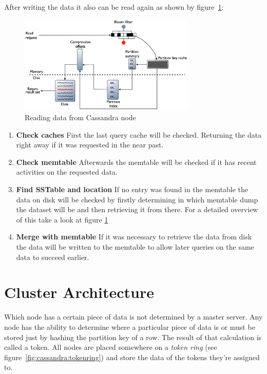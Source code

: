 After writing the data it also can be read again as shown by figure~\ref{fig:cassandra:readData}:

\begin{figure}[ht]
    \centering
    \includegraphics[width=0.75\textwidth]{img/cassandra_local_read.png}
    \caption{Reading data from Cassandra node \autocite{datastaxReadData}}
    \label{fig:cassandra:readData}
\end{figure}
\begin{enumerate}
    \item \textbf{Check caches} First the last query cache will be checked. Returning the data right away if it was requested in the near past.
    \item \textbf{Check memtable} Afterwards the memtable will be checked if it has recent activities on the requested data.
    \item \textbf{Find SSTable and location} If no entry was found in the memtable the data on disk will be checked by firstly determining in which memtable dump the dataset will be and then retrieving it from there. For a detailed overview of this take a look at figure \ref{fig:cassandra:readData}
    \item \textbf{Merge with memtable} If it was necessary to retrieve the data from disk the data will be written to the memtable to allow later queries on the same data to succeed earlier.
\end{enumerate}

\section{Cluster Architecture}\label{sec:CassandraClusterArchitecture}  %
Which node has a certain piece of data is not determined by a master server. Any node has the ability to determine where a particular piece of data is or must be stored just by hashing the partition key of a row. The result of that calculation is called a token. All nodes are placed somewhere on a \textit{token ring} (see figure~\ref{fig:cassandra:tokenring}) and store the data of the tokens they're assigned to.\autocite[2]{cassandra_paper} \autocite[209,210]{decandia2007dynamo}

